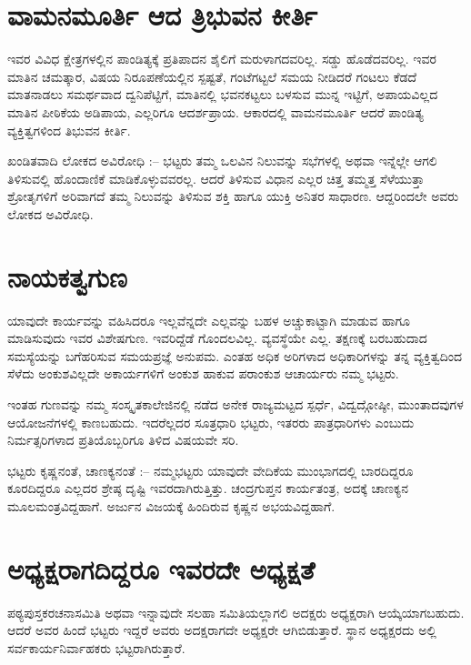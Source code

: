 {\section*{ವಾಮನಮೂರ್ತಿ ಆದ ತ್ರಿಭುವನ ಕೀರ್ತಿ}  

ಇವರ ವಿವಿಧ ಕ್ಷೇತ್ರಗಳಲ್ಲಿನ  ಪಾಂಡಿತ್ಯಕ್ಕೆ ಪ್ರತಿಪಾದನ ಶೈಲಿಗೆ ಮರುಳಾಗದವರಿಲ್ಲ.  ಸಡ್ಡು ಹೊಡೆದವರಿಲ್ಲ.  ಇವರ ಮಾತಿನ ಚಮತ್ಕಾರ, ವಿಷಯ ನಿರೂಪಣೆಯಲ್ಲಿನ ಸ್ಪಷ್ಟತೆ, ಗಂಟೆಗಟ್ಟಲೆ ಸಮಯ ನೀಡಿದರೆ ಗಂಟಲು ಕೆಡದೆ ಮಾತನಾಡಲು ಸಮರ್ಥವಾದ ದ್ವನಿಪೆಟ್ಟಿಗೆ, ಮಾತಿನಲ್ಲಿ ಭವನಕಟ್ಟಲು ಬಳಸುವ ಮುನ್ನ ಇಟ್ಟಿಗೆ, ಅಪಾಯವಿಲ್ಲದ ಮಾತಿನ ಪೀಠಿಕೆಯ ಅಡಿಪಾಯ, ಎಲ್ಲರಿಗೂ ಆದರ್ಶಪ್ರಾಯ.  ಆಕಾರದಲ್ಲಿ ವಾಮನಮೂರ್ತಿ ಆದರೆ ಪಾಂಡಿತ್ಯ ವ್ಯಕ್ತಿತ್ವಗಳಿಂದ ತಿಭುವನ ಕೀರ್ತಿ.

ಖಂಡಿತವಾದಿ ಲೋಕದ ಅವಿರೋಧಿ :–  ಭಟ್ಟರು ತಮ್ಮ ಒಲವಿನ ನಿಲುವನ್ನು ಸಭೆಗಳಲ್ಲಿ ಅಥವಾ ಇನ್ನೆಲ್ಲೇ ಆಗಲಿ ತಿಳಿಸುವಲ್ಲಿ ಹೊಂದಾಣಿಕೆ ಮಾಡಿಕೊಳ್ಳುವವರಲ್ಲ.  ಆದರೆ ತಿಳಿಸುವ ವಿಧಾನ ಎಲ್ಲರ ಚಿತ್ತ ತಮ್ಮತ್ತ ಸೆಳೆಯುತ್ತಾ ಶ್ರೋತೃಗಳಿಗೆ ಅರಿವಾಗದೆ ತಮ್ಮ ನಿಲುವನ್ನು ತಿಳಿಸುವ ಶಕ್ತಿ ಹಾಗೂ ಯುಕ್ತಿ ಅನಿತರ ಸಾಧಾರಣ.  ಆದ್ದರಿಂದಲೇ ಅವರು ಲೋಕದ ಅವಿರೋಧಿ.

\section*{ನಾಯಕತ್ವಗುಣ} 

ಯಾವುದೇ ಕಾರ್ಯವನ್ನು ವಹಿಸಿದರೂ ಇಲ್ಲವೆನ್ನದೇ ಎಲ್ಲವನ್ನು ಬಹಳ ಅಚ್ಚುಕಾಟ್ಟಾಗಿ ಮಾಡುವ ಹಾಗೂ ಮಾಡಿಸುವುದು ಇವರ ವಿಶೇಷಗುಣ.  ಇವರಿದ್ದೆಡೆ ಗೊಂದಲವಿಲ್ಲ.  ವ್ಯವಸ್ಥೆಯೇ ಎಲ್ಲ.  ತಕ್ಷಣಕ್ಕೆ ಬರಬಹುದಾದ ಸಮಸ್ಯೆಯನ್ನು ಬಗೆಹರಿಸುವ ಸಮಯಪ್ರಜ್ಞೆ ಅನುಪಮ.  ಎಂತಹ ಅಧಿಕ ಅರಿಗಳಾದ ಅಧಿಕಾರಿಗಳನ್ನು ತನ್ನ ವ್ಯಕ್ತಿತ್ವದಿಂದ ಸೆಳೆದು ಅಂಕುಶವಿಲ್ಲದೇ ಅಕಾರ್ಯಗಳಿಗೆ ಅಂಕುಶ ಹಾಕುವ ಪರಾಂಕುಶ ಆಚಾರ್ಯರು ನಮ್ಮ ಭಟ್ಟರು.

ಇಂತಹ ಗುಣವನ್ನು ನಮ್ಮ ಸಂಸ್ಕೃತಕಾಲೇಜಿನಲ್ಲಿ ನಡೆದ ಅನೇಕ ರಾಜ್ಯಮಟ್ಟದ ಸ್ಪರ್ಧೆ, ವಿದ್ವದ್ಗೋಷ್ಠೀ, ಮುಂತಾದವುಗಳ ಆಯೋಜನೆಗಳಲ್ಲಿ ಕಾಣಬಹುದು.  ಇದರೆಲ್ಲದರ ಸೂತ್ರಧಾರಿ ಭಟ್ಟರು, ಇತರರು  ಪಾತ್ರಧಾರಿಗಳು ಎಂಬುದು ನಿರ್ಮತ್ಸರಿಗಳಾದ ಪ್ರತಿಯೊಬ್ಬರಿಗೂ ತಿಳಿದ ವಿಷಯವೇ ಸರಿ.

ಭಟ್ಟರು ಕೃಷ್ಣನಂತೆ, ಚಾಣಕ್ಯನಂತೆ :–  ನಮ್ಮಭಟ್ಟರು ಯಾವುದೇ ವೇದಿಕೆಯ ಮುಂಭಾಗದಲ್ಲಿ ಬಾರದಿದ್ದರೂ ಕೂರದಿದ್ದರೂ ಎಲ್ಲದರ ಶ್ರೇಷ್ಠ ದೃಷ್ಟಿ   ಇವರದಾಗಿರುತ್ತಿತ್ತು. ಚಂದ್ರಗುಪ್ತನ ಕಾರ್ಯತಂತ್ರ, ಅದಕ್ಕೆ ಚಾಣಕ್ಯನ ಮೂಲಮಂತ್ರವಿದ್ದಹಾಗೆ.  ಅರ್ಜುನ ವಿಜಯಕ್ಕೆ ಹಿಂದಿರುವ ಕೃಷ್ಣನ ಅಭಯವಿದ್ದಹಾಗೆ. 

\section*{ಅಧ್ಯಕ್ಷರಾಗದಿದ್ದರೂ ಇವರದೇ ಅಧ್ಯಕ್ಷತೆ} 

ಪಠ್ಯಪುಸ್ತಕರಚನಾಸಮಿತಿ ಅಥವಾ ಇನ್ನಾವುದೇ ಸಲಹಾ ಸಮಿತಿಯಲ್ಲಾಗಲಿ ಅದಕ್ಷರು ಅಧ್ಯಕ್ಷರಾಗಿ ಆಯ್ಕೆಯಾಗಬಹುದು.  ಆದರೆ ಅವರ ಹಿಂದೆ ಭಟ್ಟರು ಇದ್ದರೆ ಅವರು ಅದಕ್ಷರಾಗದೇ ಅಧ್ಯಕ್ಷರೇ ಆಗಿಬಿಡುತ್ತಾರೆ.  ಸ್ಥಾನ ಅಧ್ಯಕ್ಷರದು ಅಲ್ಲಿ ಸರ್ವಕಾರ್ಯನಿರ್ವಾಹಕರು ಭಟ್ಟರಾಗಿರುತ್ತಾರೆ.

}
